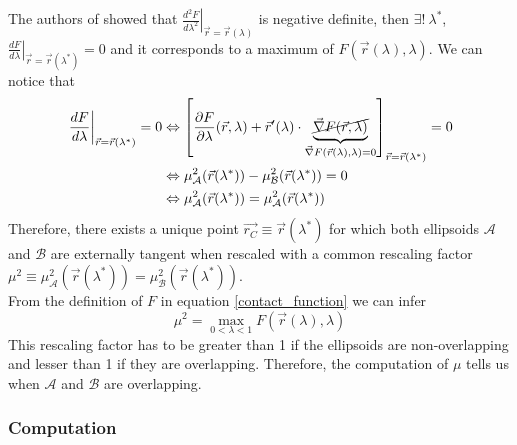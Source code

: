 \documentclass[class=report, float=false, crop=false]{standalone}
\begin{document}
The authors of \cite{perram1985statistical} showed that $\left.\frac{d^2F}{d\lambda^2}\right|_{\vec{r} = \vec{r}(\lambda)}$ is negative definite, then $\exists!~ \lambda^*$, $\left.\frac{dF}{d\lambda}\right|_{\vec{r} = \vec{r}(\lambda^*)} = 0$ and it corresponds to a maximum of $F(\vec{r}(\lambda),\lambda)$. We can notice that
\begin{align*}
\left.\frac{dF}{d\lambda}\right|_{\vec{r} = \vec{r}(\lambda^*)} = 0 &\Leftrightarrow \left[\frac{\partial F}{\partial \lambda}(\vec{r},\lambda) + \vec{r}'(\lambda)\cdot\underbrace{\cancel{\vec{\nabla}F(\vec{r},\lambda)}}_{\vec{\nabla}F(\vec{r}(\lambda),\lambda) = 0}\right]_{\vec{r}=\vec{r}(\lambda^*)} = 0\\
&\Leftrightarrow \mu_{\mathcal{A}}^2(\vec{r}(\lambda^*)) - \mu_{\mathcal{B}}^2(\vec{r}(\lambda^*)) = 0\\
&\Leftrightarrow \mu_{\mathcal{A}}^2(\vec{r}(\lambda^*)) = \mu_{\mathcal{A}}^2(\vec{r}(\lambda^*))
\end{align*}
Therefore, there exists a unique point $\vec{r_C} \equiv \vec{r}(\lambda^*)$ for which both ellipsoids $\mathcal{A}$ and $\mathcal{B}$ are externally tangent when rescaled with a common rescaling factor $\mu^2 \equiv \mu_{\mathcal{A}}^2(\vec{r}(\lambda^*)) = \mu_{\mathcal{B}}^2(\vec{r}(\lambda^*))$.\\

From the definition of $F$ in equation \ref{contact_function} we can infer
\begin{equation}
\boxed{\mu^2 = \max_{0<\lambda<1} F(\vec{r}(\lambda),\lambda)}
\end{equation}
This rescaling factor has to be greater than 1 if the ellipsoids are non-overlapping and lesser than 1 if they are overlapping. Therefore, the computation of $\mu$ tells us when $\mathcal{A}$ and $\mathcal{B}$ are overlapping.

\subsubsection{Computation}
\end{document}
